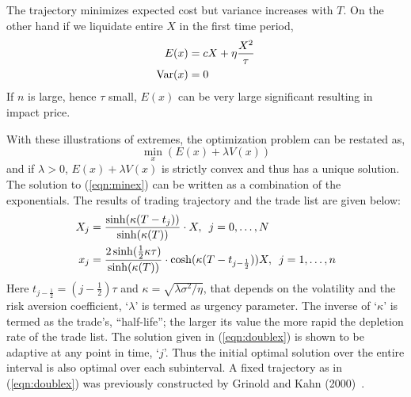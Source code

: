 The trajectory minimizes expected cost but variance increases with $T$. On the other hand if we liquidate entire $X$ in the first time period,
	\begin{equation}\label{eqn:anotherdoubleex}
	\begin{split}
	E(x) &= c X + \eta \frac{X^2}{\tau} \\
	\Var(x) &= 0
	\end{split}
	\end{equation}
If $n$ is large, hence $\tau$ small, $E(x)$ can be very large significant resulting in impact price.


 With these illustrations of extremes, the optimization problem can be restated as,
	\begin{equation}\label{eqn:minex}
	\min_x (E(x) + \lambda V(x)) 
	\end{equation}
and if $\lambda>0$, $E(x)+\lambda V(x)$ is strictly convex and thus has a unique solution. The solution to (\ref{eqn:minex}) can be written as a combination of the exponentials. The results of trading trajectory and the trade list are given below:
	\begin{equation}\label{eqn:doublex}
	\begin{split}
	X_j &= \dfrac{\sinh (\kappa(T-t_j))}{\sinh (\kappa(T))}\cdot X, \enskip j=0,\ldots,N \\
	x_j &= \dfrac{2 \sinh (\frac{1}{2}\kappa\tau)}{\sinh (\kappa(T))}\cdot \cosh(\kappa(T-t_{j-\frac{1}{2}}))X, \enskip j=1,\ldots,n
	\end{split}
	\end{equation}
Here $t_{j-\frac{1}{2}} = (j - \frac{1}{2})\tau$ and $\kappa = \sqrt{\lambda\sigma^2/\eta}$, that depends on the volatility and the risk aversion coefficient, `$\lambda$' is termed as urgency parameter. The inverse of `$\kappa$' is termed as the trade's, ``half-life''; the larger its value the more rapid the depletion rate of the trade list. The solution given in (\ref{eqn:doublex}) is shown to be adaptive at any point in time, `$j$'. Thus the initial optimal solution over the entire interval is also optimal over each subinterval. A fixed trajectory as in (\ref{eqn:doublex}) was previously constructed by Grinold and Kahn (2000)~\cite{grin2000}.


